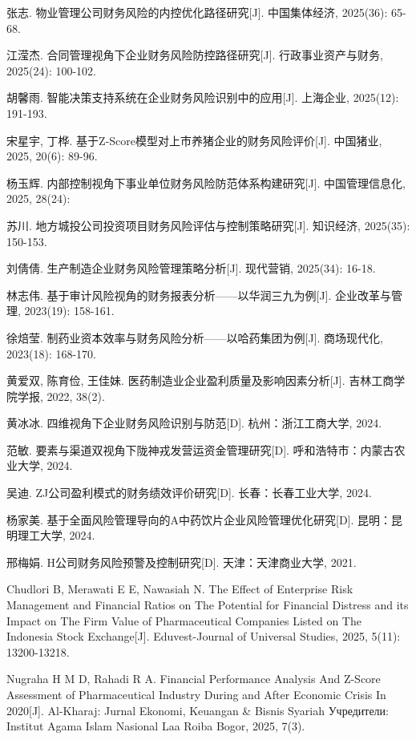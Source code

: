 \documentclass[12pt,a4paper,fontset=windows,UTF8]{ctexart}
\begin{document}
\newpage
\vspace*{3\baselineskip}

\begin{thesref}
  \item 张志. 物业管理公司财务风险的内控优化路径研究[J]. 中国集体经济, 2025(36): 65-68.
  \item 江滢杰. 合同管理视角下企业财务风险防控路径研究[J]. 行政事业资产与财务, 2025(24): 100-102.
  \item 胡馨雨. 智能决策支持系统在企业财务风险识别中的应用[J]. 上海企业, 2025(12): 191-193.
  \item 宋星宇, 丁桦. 基于Z-Score模型对上市养猪企业的财务风险评价[J]. 中国猪业, 2025, 20(6): 89-96.
  \item 杨玉辉. 内部控制视角下事业单位财务风险防范体系构建研究[J]. 中国管理信息化, 2025, 28(24):
  \item 苏川. 地方城投公司投资项目财务风险评估与控制策略研究[J]. 知识经济, 2025(35): 150-153.
  \item 刘倩倩. 生产制造企业财务风险管理策略分析[J]. 现代营销, 2025(34): 16-18.
  \item 林志伟. 基于审计风险视角的财务报表分析——以华润三九为例[J]. 企业改革与管理, 2023(19): 158-161.
  \item 徐焙莹. 制药业资本效率与财务风险分析——以哈药集团为例[J]. 商场现代化, 2023(18): 168-170.
  \item 黄爱双, 陈育俭, 王佳妹. 医药制造业企业盈利质量及影响因素分析[J]. 吉林工商学院学报, 2022, 38(2).
  \item 黄冰冰. 四维视角下企业财务风险识别与防范[D]. 杭州：浙江工商大学, 2024.
  \item 范敏. 要素与渠道双视角下陇神戎发营运资金管理研究[D]. 呼和浩特市：内蒙古农业大学, 2024.
  \item 吴迪. ZJ公司盈利模式的财务绩效评价研究[D]. 长春：长春工业大学, 2024.
  \item 杨家美. 基于全面风险管理导向的A中药饮片企业风险管理优化研究[D]. 昆明：昆明理工大学, 2024.
  \item 邢梅娟. H公司财务风险预警及控制研究[D]. 天津：天津商业大学, 2021.
  \item Chudlori B, Merawati E E, Nawasiah N. The Effect of Enterprise Risk Management and Financial Ratios on The Potential for Financial Distress and its Impact on The Firm Value of Pharmaceutical Companies Listed on The Indonesia Stock Exchange[J]. Eduvest-Journal of Universal Studies, 2025, 5(11): 13200-13218.
  \item Nugraha H M D, Rahadi R A. Financial Performance Analysis And Z-Score Assessment of Pharmaceutical Industry During and After Economic Crisis In 2020[J]. Al-Kharaj: Jurnal Ekonomi, Keuangan \& Bisnis Syariah Учредители: Institut Agama Islam Nasional Laa Roiba Bogor, 2025, 7(3).

\end{thesref}
\end{document}
